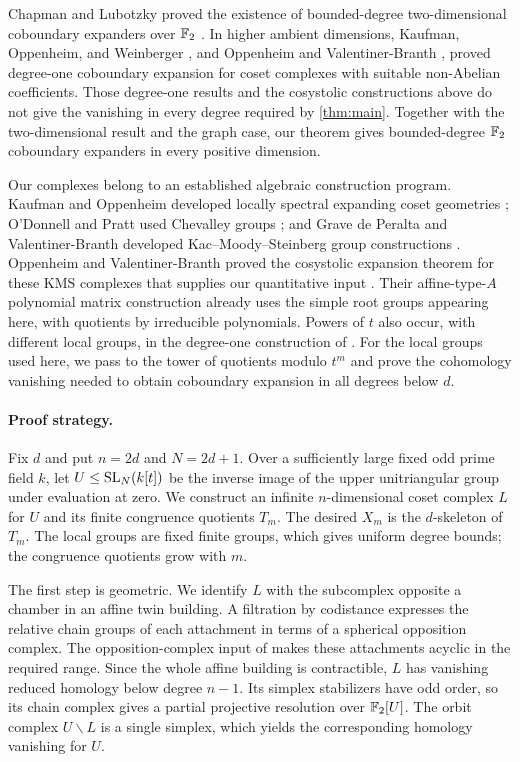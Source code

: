 Chapman and Lubotzky proved the existence of bounded-degree
two-dimensional coboundary expanders over $\mathbb F_2$
\cite[Theorem~1.9]{CL2025}. In higher ambient dimensions, Kaufman,
Oppenheim, and Weinberger \cite{KOW2025}, and Oppenheim and
Valentiner-Branth \cite{OVBNonAbelian2025}, proved degree-one coboundary
expansion for coset complexes with suitable non-Abelian coefficients.
Those degree-one results and the cosystolic constructions above do not
give the vanishing in every degree required by \cref{thm:main}.
Together with the two-dimensional result and the graph case, our theorem
gives bounded-degree $\mathbb F_2$ coboundary expanders in every positive
dimension.

Our complexes belong to an established algebraic construction program.
Kaufman and Oppenheim developed locally spectral expanding coset
geometries \cite{KO2023}; O'Donnell and Pratt used Chevalley groups
\cite{OP2022}; and Grave de Peralta and Valentiner-Branth developed
Kac--Moody--Steinberg group constructions \cite{GdPVB2025}.
Oppenheim and Valentiner-Branth proved the cosystolic expansion theorem
for these KMS complexes that supplies our quantitative input \cite{OVB}.
Their affine-type-$A$ polynomial matrix construction
\cite[Example~4.13]{OVB} already uses the simple root groups appearing
here, with quotients by irreducible polynomials. Powers of $t$ also occur,
with different local groups, in the degree-one construction of
\cite[Section~2.5 and Theorem~6.3]{KOW2025}.
For the local groups used here, we pass to the tower of quotients modulo
$t^m$ and prove the cohomology vanishing needed to obtain coboundary
expansion in all degrees below $d$.

\paragraph{Proof strategy.}
Fix $d$ and put $n=2d$ and $N=2d+1$. Over a sufficiently large fixed
odd prime field $k$, let $U\le\operatorname{SL}_N(k[t])$ be the inverse image of the
upper unitriangular group under evaluation at zero. We construct an
infinite $n$-dimensional coset complex $L$ for $U$ and its finite
congruence quotients $T_m$. The desired $X_m$ is the $d$-skeleton of
$T_m$. The local groups are fixed finite groups, which gives uniform
degree bounds; the congruence quotients grow with $m$.

The first step is geometric. We identify $L$ with the subcomplex
opposite a chamber in an affine twin building. A filtration by
codistance expresses the relative chain groups of each attachment in
terms of a spherical opposition complex. The opposition-complex input
of \cite{OVB} makes these attachments acyclic in the required range.
Since the whole affine building is contractible, $L$ has vanishing
reduced homology below degree $n-1$. Its simplex stabilizers have odd
order, so its chain complex gives a partial projective resolution over
$\mathbb F_2[U]$. The orbit complex $U\backslash L$ is a single simplex, which
yields the corresponding homology vanishing for $U$.

